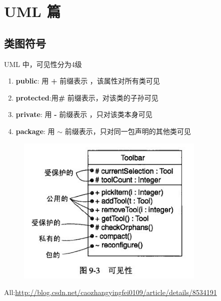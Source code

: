\documentclass[UTF8,a4paper,12pt]{ctexbook}
\begin{document}
\chapter{UML 篇}
	\section{类图符号}
		UML 中，可见性分为4级
		\begin{enumerate}[itemindent = 1em]
			\item \textbf{public}:	用 \textbf{+} 前缀表示 ，该属性对所有类可见
			\item \textbf{protected}:用\textbf{\#} 前缀表示，对该类的子孙可见
			\item \textbf{private}:	用 \textbf{-} 前缀表示 ，只对该类本身可见
			\item \textbf{package}:	用 \textbf{$\sim$} 前缀表示，只对同一包声明的其他类可见
		\end{enumerate}
	
		\begin{figure}[h]
			\centering
			\includegraphics[width = 9cm]{Simbol_UML.jpg}
		\end{figure}
		
		All:\url{http://blog.csdn.net/caozhangyingfei0109/article/details/8534191}
	\newpage
\end{document}
